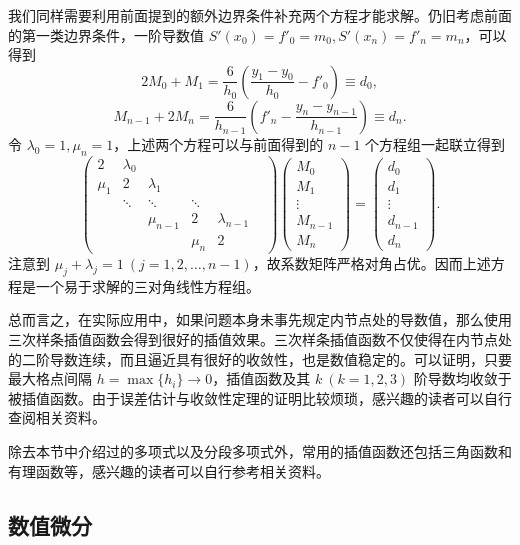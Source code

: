 我们同样需要利用前面提到的额外边界条件补充两个方程才能求解。仍旧考虑前面的第一类边界条件，一阶导数值 $S'(x_0)=f'_0=m_0,S'(x_n)=f'_n=m_n$，可以得到
\[
2M_0+M_1=\frac{6}{h_0}\left(\frac{y_1-y_0}{h_0}-f'_0\right)\equiv d_0,
\]
\[
M_{n-1}+2M_n=\frac{6}{h_{n-1}}\left(f'_n-\frac{y_n-y_{n-1}}{h_{n-1}}\right)\equiv d_n.
\]
令 $\lambda_0=1,\mu_n=1$，上述两个方程可以与前面得到的 $n-1$ 个方程组一起联立得到
\begin{equation}
\begin{pmatrix}
2&\lambda_0&&&&\\
\mu_1&2&\lambda_1&&&\\
&\ddots&\ddots&\ddots&&\\
&&\mu_{n-1}&2&\lambda_{n-1}\\
&&&\mu_n&2
\end{pmatrix}
\begin{pmatrix}
M_0\\M_1\\\vdots\\M_{n-1}\\M_n
\end{pmatrix}
=
\begin{pmatrix}
d_0\\d_1\\\vdots\\d_{n-1}\\d_n
\end{pmatrix}.
\tag{2.1.27}
\end{equation}
注意到 $\mu_j+\lambda_j=1\ (j=1,2,\ldots,n-1)$，故系数矩阵严格对角占优。因而上述方程是一个易于求解的三对角线性方程组。

总而言之，在实际应用中，如果问题本身未事先规定内节点处的导数值，那么使用三次样条插值函数会得到很好的插值效果。三次样条插值函数不仅使得在内节点处的二阶导数连续，而且逼近具有很好的收敛性，也是数值稳定的。可以证明，只要最大格点间隔 $h=\max\{h_i\}\to0$，插值函数及其 $k\ (k=1,2,3)$ 阶导数均收敛于被插值函数。由于误差估计与收敛性定理的证明比较烦琐，感兴趣的读者可以自行查阅相关资料。

除去本节中介绍过的多项式以及分段多项式外，常用的插值函数还包括三角函数和有理函数等，感兴趣的读者可以自行参考相关资料。

\subsection{数值微分}

